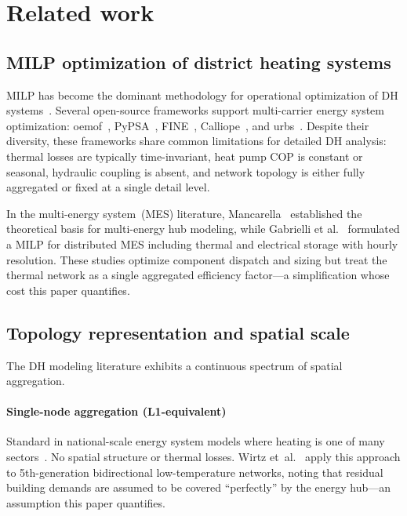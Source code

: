 \documentclass[review,3p]{elsarticle}
\begin{document}
\section{Related work}
\label{sec:related_work}

\subsection{MILP optimization of district heating systems}
\label{sec:rw_milp}

MILP has become the dominant methodology for operational optimization
of DH systems~\cite{Fang2016,Guelpa2019review}. Several open-source
frameworks support multi-carrier energy system optimization:
oemof~\cite{Hilpert2018_oemof}, PyPSA~\cite{Brown2018_pypsa},
FINE~\cite{Welder2018_FINE}, Calliope~\cite{Pfenninger2018_calliope},
and urbs~\cite{Dorfner2016_urbs}. Despite their diversity, these
frameworks share common limitations for detailed DH analysis: thermal
losses are typically time-invariant, heat pump COP is constant or
seasonal, hydraulic coupling is absent, and network topology is either
fully aggregated or fixed at a single detail level.

In the multi-energy system~(MES) literature,
Mancarella~\cite{Mancarella2014} established the theoretical basis for
multi-energy hub modeling, while Gabrielli et
al.~\cite{Gabrielli2018} formulated a MILP for distributed MES
including thermal and electrical storage with hourly resolution. These
studies optimize component dispatch and sizing but treat the thermal
network as a single aggregated efficiency factor---a simplification
whose cost this paper quantifies.

\subsection{Topology representation and spatial scale}
\label{sec:rw_topology}

The DH modeling literature exhibits a continuous spectrum of spatial
aggregation.

\paragraph{Single-node aggregation (L1-equivalent)}
Standard in national-scale energy system models where heating is one
of many sectors~\cite{Connolly2014_EnergyPLAN,Brown2018_pypsa,
Lund2017_SmartEnergy}. No spatial structure or thermal losses. Wirtz
et~al.~\cite{Wirtz2020} apply this approach to 5th-generation
bidirectional low-temperature networks, noting that residual building
demands are assumed to be covered ``perfectly'' by the energy
hub---an assumption this paper quantifies.
\end{document}
